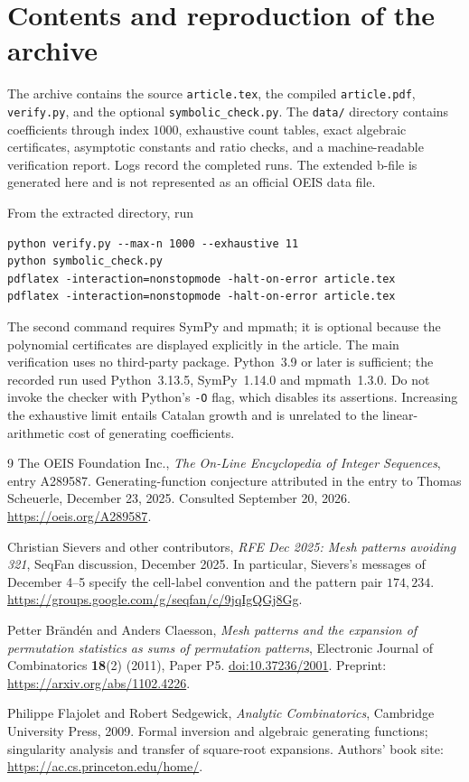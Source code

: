 \documentclass[11pt,a4paper]{article}
\theoremstyle{definition}
\theoremstyle{remark}
\begin{document}
\appendix
\section{Contents and reproduction of the archive}

The archive contains the source \texttt{article.tex}, the compiled
\texttt{article.pdf}, \texttt{verify.py}, and the optional
\texttt{symbolic\_check.py}. The \texttt{data/} directory contains
coefficients through index $1000$, exhaustive count tables, exact algebraic
certificates, asymptotic constants and ratio checks, and a machine-readable
verification report. Logs record the completed runs. The extended b-file
is generated here and is not represented as an official OEIS data file.

From the extracted directory, run
\begin{lstlisting}
python verify.py --max-n 1000 --exhaustive 11
python symbolic_check.py
pdflatex -interaction=nonstopmode -halt-on-error article.tex
pdflatex -interaction=nonstopmode -halt-on-error article.tex
\end{lstlisting}
The second command requires SymPy and mpmath; it is optional because the
polynomial certificates are displayed explicitly in the article. The main
verification uses no third-party package. Python~3.9 or later is sufficient;
the recorded run used Python~3.13.5, SymPy~1.14.0 and mpmath~1.3.0.
Do not invoke the checker with Python's \texttt{-O} flag, which disables
its assertions. Increasing the exhaustive limit entails Catalan growth
and is unrelated to the linear-arithmetic cost of generating coefficients.

\begin{thebibliography}{9}
The OEIS Foundation Inc.,
\emph{The On-Line Encyclopedia of Integer Sequences}, entry A289587.
Generating-function conjecture attributed in the entry to Thomas Scheuerle,
December 23, 2025. Consulted September 20, 2026.
\url{https://oeis.org/A289587}.

Christian Sievers and other contributors,
\emph{RFE Dec 2025: Mesh patterns avoiding 321}, SeqFan discussion,
December 2025. In particular, Sievers's messages of December 4--5 specify
the cell-label convention and the pattern pair $174,234$.
\url{https://groups.google.com/g/seqfan/c/9jqIgQGj8Gg}.

Petter Br\"and\'en and Anders Claesson,
\emph{Mesh patterns and the expansion of permutation statistics as sums
of permutation patterns}, Electronic Journal of Combinatorics
\textbf{18}(2) (2011), Paper P5.
\href{https://doi.org/10.37236/2001}{doi:10.37236/2001}.
Preprint: \url{https://arxiv.org/abs/1102.4226}.

Philippe Flajolet and Robert Sedgewick,
\emph{Analytic Combinatorics}, Cambridge University Press, 2009.
Formal inversion and algebraic generating functions; singularity analysis
and transfer of square-root expansions.
Authors' book site: \url{https://ac.cs.princeton.edu/home/}.
\end{thebibliography}
\end{document}
